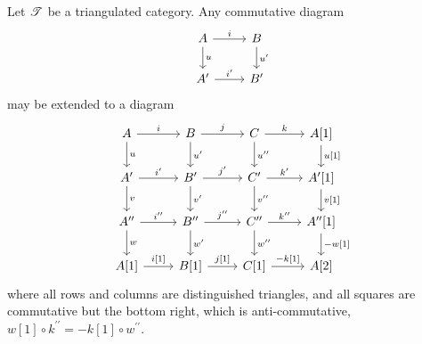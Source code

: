 \documentclass[dissertation.tex]{subfiles}
\begin{document}
\begin{prop}\label{extendsquare}
  Let $\mathscr{T}$ be a triangulated category.
  Any commutative diagram
  $$\begin{tikzcd}
    A \arrow{r}{i}\arrow{d}{u}& B\arrow{d}{u^\prime}\\
    A^\prime \arrow{r}{i^\prime}& B^\prime
  \end{tikzcd}$$
  may be extended to a diagram
  $$\begin{tikzcd}
    A \arrow{r}{i}\arrow{d}{u}& B\arrow{d}{u^\prime}\arrow{r}{j} & C \arrow{r}{k}\arrow{d}{u^{\prime\prime}} & A[1]\arrow{d}{u[1]}\\
    A^\prime \arrow{r}{i^\prime}\arrow{d}{v}& B^\prime\arrow{r}{j^\prime}\arrow{d}{v^\prime} & C^\prime \arrow{r}{k^\prime}\arrow{d}{v^{\prime\prime}} & A^\prime[1]\arrow{d}{v[1]}\\
    A^{\prime\prime} \arrow{r}{i^{\prime\prime}}\arrow{d}{w} & B^{\prime\prime} \arrow{r}{j^{\prime\prime}}\arrow{d}{w^\prime} & C^{\prime\prime} \arrow{r}{k^{\prime\prime}}\arrow{d}{w^{\prime\prime}} & A^{\prime\prime}[1]\arrow{d}{-w[1]}\\
    A[1] \arrow{r}{i[1]} & B[1] \arrow{r}{j[1]} & C[1] \arrow{r}{-k[1]} & A[2]
  \end{tikzcd}$$
  where all rows and columns are distinguished triangles, and all squares are commutative but the bottom right, which is anti-commutative,
  $w[1] \circ k^{\prime\prime} = - k[1] \circ w^{\prime\prime}$.
  

\end{prop}
\end{document}
